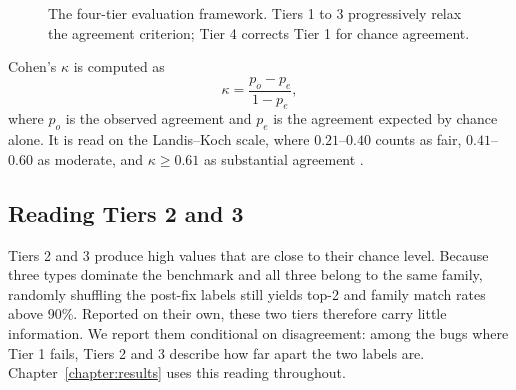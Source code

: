 \documentclass{iutbscthesis}
\begin{document}
\begin{figure}[!htbp]
\centering
{}
\caption{The four-tier evaluation framework. Tiers 1 to 3 progressively relax the agreement criterion; Tier 4 corrects Tier 1 for chance agreement.}
\label{fig:eval_levels}
\end{figure}

Cohen's $\kappa$ is computed as
\begin{equation}
    \kappa = \frac{p_o - p_e}{1 - p_e},
    \label{eq:kappa}
\end{equation}
where $p_o$ is the observed agreement and $p_e$ is the agreement expected by chance alone. It is read on the Landis--Koch scale, where $0.21$--$0.40$ counts as fair, $0.41$--$0.60$ as moderate, and $\kappa \geq 0.61$ as substantial agreement \cite{landis1977measurement}.

\subsection{Reading Tiers 2 and 3}
\label{sec:l3l4}

Tiers 2 and 3 produce high values that are close to their chance level. Because three types dominate the benchmark and all three belong to the same family, randomly shuffling the post-fix labels still yields top-2 and family match rates above 90\%. Reported on their own, these two tiers therefore carry little information. We report them conditional on disagreement: among the bugs where Tier 1 fails, Tiers 2 and 3 describe how far apart the two labels are. Chapter~\ref{chapter:results} uses this reading throughout.
\end{document}
